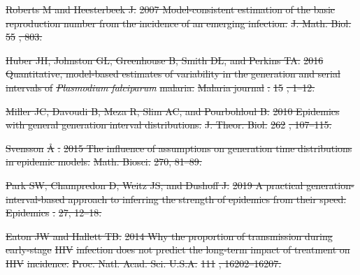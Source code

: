 \documentclass[12pt]{article}
\providecommand{\DIFdeltex}[1]{{\protect\color{red}\sout{#1}}}                      %
\providecommand{\DIFdel}[1]{\texorpdfstring{\DIFdeltex{#1}}{}} %
\begin{document}
\DIFdel{Roberts M and Heesterbeek J.
}%
\DIFdel{2007 Model-consistent estimation of the basic reproduction number
  from the incidence of an emerging infection.
}%
\DIFdel{J. Math. Biol.}%
\DIFdel{55}%
\DIFdel{, 803.
}%

\DIFdel{Huber JH, Johnston GL, Greenhouse B, Smith DL, and Perkins TA.
}%
\DIFdel{2016 Quantitative, model-based estimates of variability in the
  generation and serial intervals of }\textit{\DIFdel{Plasmodium falciparum}} %
\DIFdel{malaria.
}%
\DIFdel{Malaria journal}%
\DIFdel{.
}%
\DIFdel{15}%
\DIFdel{, 1--12.
}%

\DIFdel{Miller JC, Davoudi B, Meza R, Slim AC, and Pourbohloul B.
}%
\DIFdel{2010 Epidemics with general generation interval distributions.
}%
\DIFdel{J. Theor. Biol.}%
\DIFdel{262}%
\DIFdel{, 107--115.
}%

\DIFdel{Svensson }%
\DIFdel{\AA}%
\DIFdel{.
}%
\DIFdel{2015 The influence of assumptions on generation time distributions in
  epidemic models.
}%
\DIFdel{Math. Biosci.}%
\DIFdel{270, 81--89.
}%

\DIFdel{Park SW, Champredon D, Weitz JS, and Dushoff J.
}%
\DIFdel{2019 A practical generation-interval-based approach to inferring the
  strength of epidemics from their speed.
}%
\DIFdel{Epidemics}%
\DIFdel{.
}%
\DIFdel{27, 12--18.
}%

\DIFdel{Eaton JW and Hallett TB.
}%
\DIFdel{2014 Why the proportion of transmission during early-stage }%
\DIFdel{HIV}%
\DIFdel{infection does not predict the long-term impact of treatment on }%
\DIFdel{HIV}%
\DIFdel{incidence.
}%
\DIFdel{Proc. Natl. Acad. Sci. U.S.A.}%
\DIFdel{111}%
\DIFdel{, 16202--16207.
}%
\end{document}
